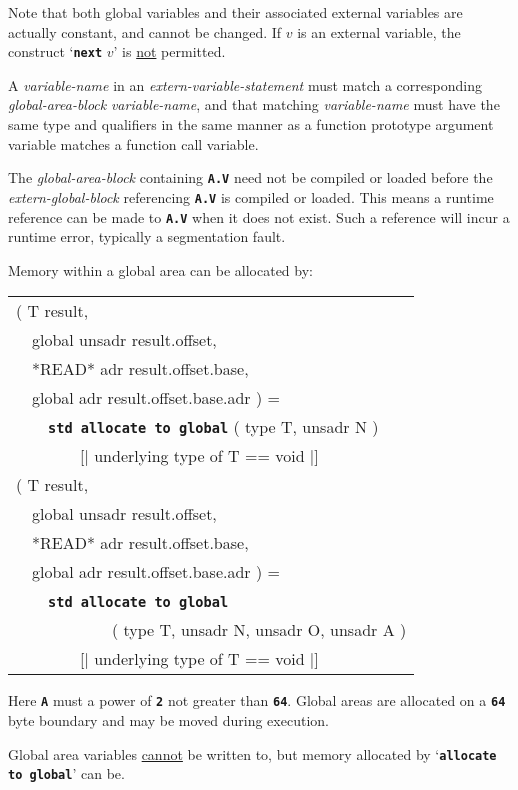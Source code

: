 \documentclass[12pt]{article}
\makeatletter
\newcommand{\TT}[1]{{\tt \bfseries #1}}
\newcommand{\ttstdkey}[1]{\TT{std #1}\index{#1@{\tt std #1}}}
\newenvironment{indpar}[1][0.3in]%
	{\begin{list}{}%
		     {\setlength{\itemsep}{0in}%
		      \setlength{\topsep}{0in}%
		      \setlength{\parsep}{1ex}%
		      \setlength{\labelwidth}{#1}%
		      \setlength{\leftmargin}{#1}%
		      \addtolength{\leftmargin}{\labelsep}}%
	 \item}%
	{\end{list}}
\makeatother
\begin{document}
Note that both global variables and their associated external variables
are actually constant, and cannot be changed.  If $v$ is an external
variable, the construct `\TT{next} $v$' is \underline{not} permitted.

A {\em variable-name} in an
{\em extern-variable-statement} must match a corresponding
{\em global-area-block} {\em variable-name}, and that matching
{\em variable-name} must have the same type and qualifiers
in the same manner as a function prototype argument variable
matches a function call variable.

The {\em global-area-block} containing \TT{A.V} need not be compiled
or loaded before the {\em extern-global-block} referencing
\TT{A.V} is compiled or loaded.  This means a runtime reference
can be made to \TT{A.V} when it does not exist.  Such a reference
will incur a runtime error, typically a segmentation fault.

Memory within a global area can be allocated by:

\begin{indpar}\tt\begin{tabular}{l}
( T result, \\
~~global unsadr result.offset, \\
~~*READ* adr result.offset.base, \\
~~global adr result.offset.base.adr  ) = \\
~~~~\ttstdkey{allocate to global} ( type T, unsadr N ) \\
~~~~~~~~[| underlying type of T == void |]
\\[1ex]
( T result, \\
~~global unsadr result.offset, \\
~~*READ* adr result.offset.base, \\
~~global adr result.offset.base.adr  ) = \\
~~~~\ttstdkey{allocate to global} \\
~~~~~~~~~~~~( type T, unsadr N, unsadr O, unsadr A ) \\
~~~~~~~~[| underlying type of T == void |]
\end{tabular}\end{indpar}\label{ALLOCATE-TO-GLOBAL}

Here \TT{A} must a power of \TT{2} not greater than \TT{64}.
Global areas are allocated on a \TT{64} byte boundary and
may be moved during execution.

Global area variables \underline{cannot} be written to, but memory allocated
by `\TT{allocate to global}' can be.
\end{document}
